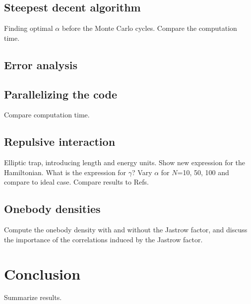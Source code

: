 \documentclass{article}
\begin{document}
\subsection{Steepest decent algorithm}
Finding optimal $\alpha$ before the Monte Carlo cycles. Compare the computation time.

\subsection{Error analysis}

\subsection{Parallelizing the code}
Compare computation time.

\subsection{Repulsive interaction}
Elliptic trap, introducing length and energy units. Show new expression for the Hamiltonian. What is the expression for $\gamma$? Vary $\alpha$ for $N$=10, 50, 100 and compare to ideal case. Compare results to Refs.

\subsection{Onebody densities}
Compute the onebody density with and without the Jastrow factor, and discuss the importance of the correlations induced by the Jastrow factor.

\section{Conclusion}
Summarize results.
\end{document}
